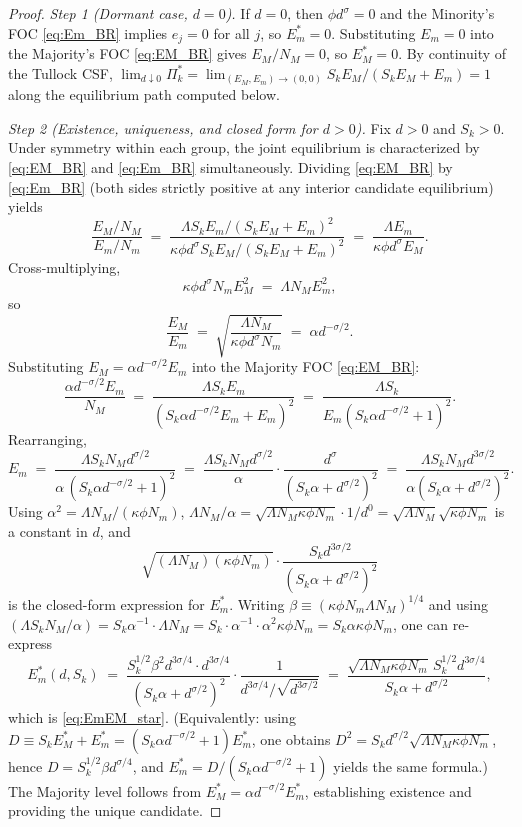 \begin{proof}
\textit{Step 1 (Dormant case, $d=0$).} If $d=0$, then $\phi d^\sigma=0$ and the Minority's FOC \autoref{eq:Em_BR} implies $e_j=0$ for all $j$, so $E_m^*=0$. Substituting $E_m=0$ into the Majority's FOC \autoref{eq:EM_BR} gives $E_M/N_M=0$, so $E_M^*=0$. By continuity of the Tullock CSF, $\lim_{d\downarrow 0}\Pi_k^*=\lim_{(E_M,E_m)\to(0,0)} S_k E_M/(S_k E_M+E_m)=1$ along the equilibrium path computed below.

\textit{Step 2 (Existence, uniqueness, and closed form for $d>0$).} Fix $d>0$ and $S_k>0$. Under symmetry within each group, the joint equilibrium is characterized by \autoref{eq:EM_BR} and \autoref{eq:Em_BR} simultaneously. Dividing \autoref{eq:EM_BR} by \autoref{eq:Em_BR} (both sides strictly positive at any interior candidate equilibrium) yields
\[
\frac{E_M/N_M}{E_m/N_m}
\;=\;
\frac{\Lambda S_k E_m/(S_k E_M+E_m)^2}{\kappa\phi d^\sigma S_k E_M/(S_k E_M+E_m)^2}
\;=\;
\frac{\Lambda E_m}{\kappa\phi d^\sigma E_M}.
\]
Cross-multiplying,
\begin{equation}\label{eq:effort_ratio_eq}
\kappa\phi d^\sigma N_m E_M^2 \;=\; \Lambda N_M E_m^2,
\end{equation}
so
\[
\frac{E_M}{E_m}\;=\;\sqrt{\frac{\Lambda N_M}{\kappa\phi d^\sigma N_m}} \;=\; \alpha d^{-\sigma/2}.
\]
Substituting $E_M=\alpha d^{-\sigma/2} E_m$ into the Majority FOC \autoref{eq:EM_BR}:
\[
\frac{\alpha d^{-\sigma/2} E_m}{N_M}\;=\;\frac{\Lambda S_k E_m}{(S_k \alpha d^{-\sigma/2} E_m + E_m)^2}
\;=\;\frac{\Lambda S_k}{E_m(S_k\alpha d^{-\sigma/2}+1)^2}.
\]
Rearranging,
\[
E_m \;=\; \frac{\Lambda S_k N_M d^{\sigma/2}}{\alpha\,(S_k\alpha d^{-\sigma/2}+1)^2}
\;=\;\frac{\Lambda S_k N_M d^{\sigma/2}}{\alpha}\cdot\frac{d^\sigma}{(S_k\alpha+d^{\sigma/2})^2}
\;=\; \frac{\Lambda S_k N_M d^{3\sigma/2}}{\alpha(S_k\alpha+d^{\sigma/2})^2}.
\]
Using $\alpha^2 = \Lambda N_M/(\kappa\phi N_m)$, $\Lambda N_M/\alpha = \sqrt{\Lambda N_M\kappa\phi N_m}\cdot 1/d^{0}=\sqrt{\Lambda N_M}\sqrt{\kappa\phi N_m}$ is a constant in $d$, and
\[
\sqrt{(\Lambda N_M)(\kappa\phi N_m)}\cdot\frac{S_k d^{3\sigma/2}}{(S_k\alpha+d^{\sigma/2})^2}
\]
is the closed-form expression for $E_m^*$. Writing $\beta \equiv (\kappa\phi N_m\Lambda N_M)^{1/4}$ and using $(\Lambda S_k N_M /\alpha)=S_k\alpha^{-1}\cdot\Lambda N_M = S_k\cdot \alpha^{-1}\cdot\alpha^2\kappa\phi N_m=S_k\alpha\kappa\phi N_m$, one can re-express
\[
E_m^*(d,S_k)
\;=\;\frac{S_k^{1/2}\beta^2 d^{3\sigma/4}\cdot d^{3\sigma/4}}{(S_k\alpha+d^{\sigma/2})^2}\cdot\frac{1}{d^{3\sigma/4}/\sqrt{d^{3\sigma/2}}}
\;=\;\frac{\sqrt{\Lambda N_M\kappa\phi N_m}\,S_k^{1/2}d^{3\sigma/4}}{S_k\alpha+d^{\sigma/2}},
\]
which is \autoref{eq:EmEM_star}. (Equivalently: using $D\equiv S_k E_M^*+E_m^*=(S_k\alpha d^{-\sigma/2}+1)E_m^*$, one obtains $D^2 = S_k d^{\sigma/2}\sqrt{\Lambda N_M\kappa\phi N_m}$, hence $D=S_k^{1/2}\beta d^{\sigma/4}$, and $E_m^*=D/(S_k\alpha d^{-\sigma/2}+1)$ yields the same formula.) The Majority level follows from $E_M^*=\alpha d^{-\sigma/2}E_m^*$, establishing existence and providing the unique candidate.


\end{proof}
